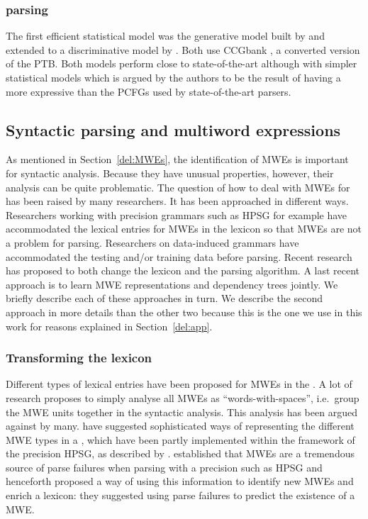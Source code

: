 \documentclass[output=paper]{langsci/langscibook}
\begin{document}
                        \subsubsection{ parsing}
                        \indent The first efficient statistical model was the generative model built by \citet{hockenmaier2002} and extended to a discriminative model by \citet{clarkcurran2007}. Both use CCGbank \citep{hockenmaier2007}, a  converted version of the PTB. Both models perform close to state-of-the-art although with simpler statistical models which is argued by the authors to be the result of having a more expressive  than the PCFGs used by state-of-the-art parsers.

                        \subsection{Syntactic parsing and multiword expressions}
                        \label{del:syntacticparsingandMWES}
                        \indent As mentioned in Section~\ref{del:MWEs}, the identification of MWEs is important for syntactic analysis. Because they have unusual properties, however, their analysis can be quite problematic. The question of how to deal with MWEs for  has been raised by many researchers. It has been approached in different ways. Researchers working with precision grammars such as HPSG for example have accommodated the lexical entries for MWEs in the lexicon so that MWEs are not a problem for parsing. Researchers on data-induced grammars have accommodated the testing and/or training data before parsing. Recent research has proposed to both change the lexicon and the parsing algorithm. A last recent approach is to learn MWE representations and dependency trees jointly. We briefly describe each of these approaches in turn. We describe the second approach in more details than the other two because this is the one we use in this work for reasons explained in Section~\ref{del:app}.

                        \subsubsection{Transforming the lexicon}
                        \indent Different types of lexical entries have been proposed for MWEs in the . A lot of research proposes to simply analyse all MWEs as ``words-with-spaces'', i.e.\ group the MWE units together in the syntactic analysis. This analysis has been argued against by many. \citet{sag02} have suggested sophisticated ways of representing the different MWE types in a , which have been partly implemented within the framework of the precision  HPSG, as described by \citet{copestakeetal2002}. \citet{zhangetal2006} established that MWEs are a tremendous source of parse failures when parsing with a precision  such as HPSG and henceforth proposed a way of using this information to identify new MWEs and enrich a lexicon: they suggested using parse failures to predict the existence of a MWE.
\end{document}
